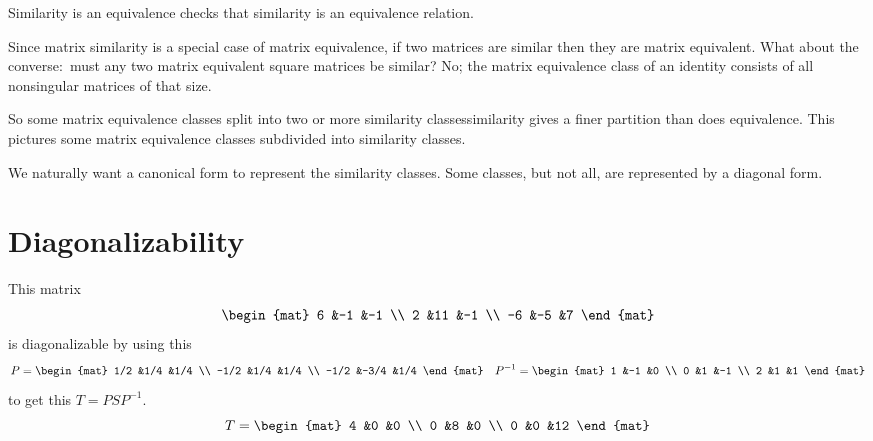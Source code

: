 \documentclass[10pt,t,serif,professionalfont]{beamer}
\begin{document}
\begin{frame}{Similarity is an equivalence}
 checks that
similarity is an equivalence relation.

\pause
Since matrix similarity is a special case of matrix equivalence, 
if two matrices are similar then they are matrix equivalent.
What about the converse:~must any two matrix equivalent square matrices be 
similar?
No; the matrix equivalence class
of an identity consists of all nonsingular matrices of that size. 

\pause
So some matrix equivalence classes
split into two or more similarity classes\Dash similarity gives a finer
partition than does equivalence.
This pictures some matrix equivalence classes subdivided into
similarity classes.

\pause
We naturally want a canonical form to represent the similarity classes.
Some classes, but not all,
are represented by a diagonal form.
\end{frame}




\section{Diagonalizability}
\begin{frame}
\df[df:Diagonalizable]

\ex
This matrix
\begin{equation*}
  \begin{mat}
    6 &-1  &-1 \\
    2 &11  &-1 \\
   -6 &-5  &7
  \end{mat}
\end{equation*}
is diagonalizable by using this
\begin{equation*}
  P=
  \begin{mat}
    1/2 &1/4  &1/4 \\
   -1/2 &1/4  &1/4 \\
   -1/2 &-3/4 &1/4
  \end{mat}
  \quad
  P^{-1}=
  \begin{mat}
    1 &-1 &0 \\
    0 &1 &-1 \\
    2 &1 &1
  \end{mat}
\end{equation*}
to get this $T=PSP^{-1}$.
\begin{equation*}
  T=
  \begin{mat}
    4 &0 &0 \\
    0 &8 &0 \\
    0 &0 &12
  \end{mat}
\end{equation*}
\end{frame}
\begin{frame}
\ex  
{}  
\end{frame}
\end{document}
